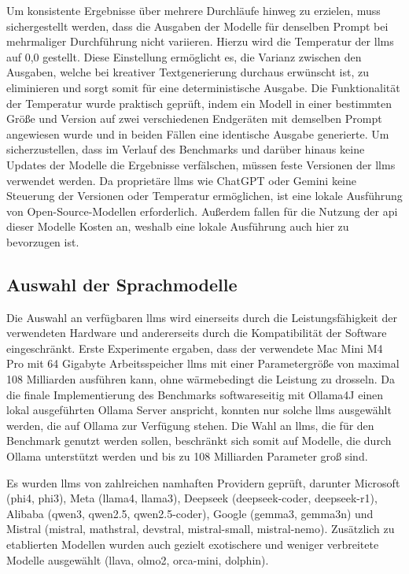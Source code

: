 Um konsistente Ergebnisse über mehrere Durchläufe hinweg zu erzielen, muss sichergestellt werden, dass die Ausgaben der Modelle für denselben Prompt bei mehrmaliger Durchführung nicht variieren.
Hierzu wird die Temperatur der \glspl{llm} auf 0,0 gestellt.
Diese Einstellung ermöglicht es, die Varianz zwischen den Ausgaben, welche bei kreativer Textgenerierung durchaus erwünscht ist, zu eliminieren und sorgt somit für eine deterministische Ausgabe.
Die Funktionalität der Temperatur wurde praktisch geprüft, indem ein Modell in einer bestimmten Größe und Version auf zwei verschiedenen Endgeräten mit demselben Prompt angewiesen wurde und in beiden Fällen eine identische Ausgabe generierte.
Um sicherzustellen, dass im Verlauf des Benchmarks und darüber hinaus keine Updates der Modelle die Ergebnisse verfälschen, müssen feste Versionen der \glspl{llm} verwendet werden.
Da proprietäre \glspl{llm} wie ChatGPT oder Gemini keine Steuerung der Versionen oder Temperatur ermöglichen, ist eine lokale Ausführung von Open-Source-Modellen erforderlich.
Außerdem fallen für die Nutzung der \gls{api} dieser Modelle Kosten an, weshalb eine lokale Ausführung auch hier zu bevorzugen ist.


\subsection{Auswahl der Sprachmodelle}\label{sec:modelle-benchmark}

Die Auswahl an verfügbaren \glspl{llm} wird einerseits durch die Leistungsfähigkeit der verwendeten Hardware und andererseits durch die Kompatibilität der Software eingeschränkt.
Erste Experimente ergaben, dass der verwendete Mac Mini M4 Pro mit 64 Gigabyte Arbeitsspeicher \glspl{llm} mit einer Parametergröße von maximal 108 Milliarden ausführen kann, ohne wärmebedingt die Leistung zu drosseln.
Da die finale Implementierung des Benchmarks softwareseitig mit Ollama4J einen lokal ausgeführten Ollama Server anspricht, konnten nur solche \glspl{llm} ausgewählt werden, die auf Ollama zur Verfügung stehen.
Die Wahl an \glspl{llm}, die für den Benchmark genutzt werden sollen, beschränkt sich somit auf Modelle, die durch Ollama unterstützt werden und bis zu 108 Milliarden Parameter groß sind.

Es wurden \glspl{llm} von zahlreichen namhaften Providern geprüft, darunter Microsoft (phi4, phi3), Meta (llama4, llama3), Deepseek (deepseek-coder, deepseek-r1), Alibaba (qwen3, qwen2.5, qwen2.5-coder), Google (gemma3, gemma3n) und Mistral (mistral, mathstral, devstral, mistral-small, mistral-nemo).
Zusätzlich zu etablierten Modellen wurden auch gezielt exotischere und weniger verbreitete Modelle ausgewählt (llava, olmo2, orca-mini, dolphin).

